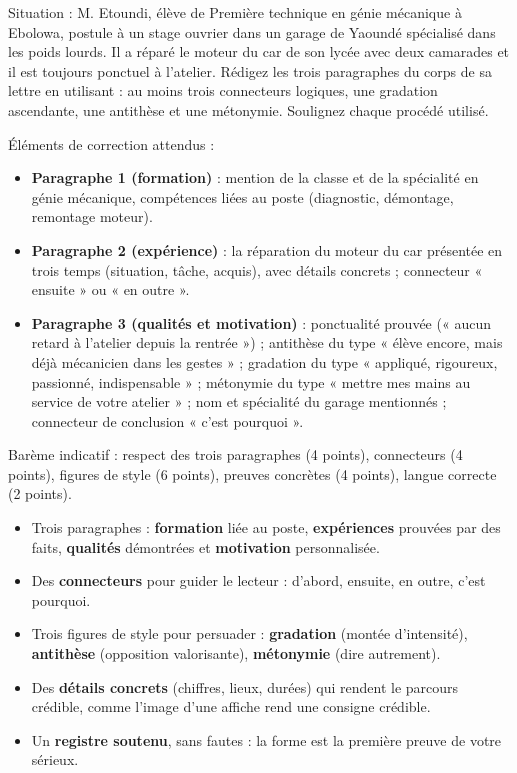 \documentclass[11pt]{article}
\begin{document}
\begin{exercice}
Situation : M. Etoundi, élève de Première technique en génie mécanique à Ebolowa, postule à un stage ouvrier dans un garage de Yaoundé spécialisé dans les poids lourds. Il a réparé le moteur du car de son lycée avec deux camarades et il est toujours ponctuel à l'atelier. Rédigez les trois paragraphes du corps de sa lettre en utilisant : au moins trois connecteurs logiques, une gradation ascendante, une antithèse et une métonymie. Soulignez chaque procédé utilisé.
\end{exercice}

\begin{corrige}[Exercice n]
Éléments de correction attendus :
\begin{itemize}
\item \textbf{Paragraphe 1 (formation)} : mention de la classe et de la spécialité en génie mécanique, compétences liées au poste (diagnostic, démontage, remontage moteur).
\item \textbf{Paragraphe 2 (expérience)} : la réparation du moteur du car présentée en trois temps (situation, tâche, acquis), avec détails concrets ; connecteur « ensuite » ou « en outre ».
\item \textbf{Paragraphe 3 (qualités et motivation)} : ponctualité prouvée (« aucun retard à l'atelier depuis la rentrée ») ; antithèse du type « élève encore, mais déjà mécanicien dans les gestes » ; gradation du type « appliqué, rigoureux, passionné, indispensable » ; métonymie du type « mettre mes mains au service de votre atelier » ; nom et spécialité du garage mentionnés ; connecteur de conclusion « c'est pourquoi ».
\end{itemize}
Barème indicatif : respect des trois paragraphes (4 points), connecteurs (4 points), figures de style (6 points), preuves concrètes (4 points), langue correcte (2 points).
\end{corrige}

\begin{aretenir}
\begin{itemize}
\item Trois paragraphes : \textbf{formation} liée au poste, \textbf{expériences} prouvées par des faits, \textbf{qualités} démontrées et \textbf{motivation} personnalisée.
\item Des \textbf{connecteurs} pour guider le lecteur : d'abord, ensuite, en outre, c'est pourquoi.
\item Trois figures de style pour persuader : \textbf{gradation} (montée d'intensité), \textbf{antithèse} (opposition valorisante), \textbf{métonymie} (dire autrement).
\item Des \textbf{détails concrets} (chiffres, lieux, durées) qui rendent le parcours crédible, comme l'image d'une affiche rend une consigne crédible.
\item Un \textbf{registre soutenu}, sans fautes : la forme est la première preuve de votre sérieux.
\end{itemize}
\end{aretenir}
\end{document}
